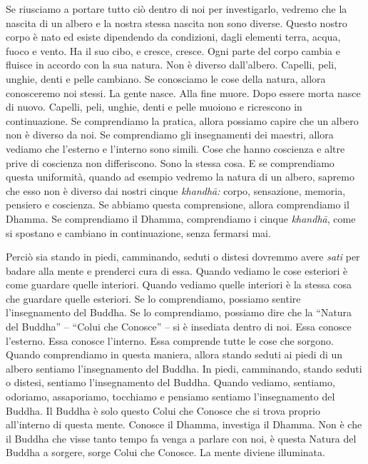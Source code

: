 Se riusciamo a portare tutto ciò dentro di noi per investigarlo, vedremo
che la nascita di un albero e la nostra stessa nascita non sono diverse.
Questo nostro corpo è nato ed esiste dipendendo da condizioni, dagli
elementi terra, acqua, fuoco e vento. Ha il suo cibo, e cresce, cresce.
Ogni parte del corpo cambia e fluisce in accordo con la sua natura. Non
è diverso dall'albero. Capelli, peli, unghie, denti e pelle cambiano. Se
conosciamo le cose della natura, allora conosceremo noi stessi. La gente
nasce. Alla fine muore. Dopo essere morta nasce di nuovo. Capelli, peli,
unghie, denti e pelle muoiono e ricrescono in continuazione. Se
comprendiamo la pratica, allora possiamo capire che un albero non è
diverso da noi. Se comprendiamo gli insegnamenti dei maestri, allora
vediamo che l'esterno e l'interno sono simili. Cose che hanno coscienza
e altre prive di coscienza non differiscono. Sono la stessa cosa. E se
comprendiamo questa uniformità, quando ad esempio vedremo la natura di
un albero, sapremo che esso non è diverso dai nostri cinque
\emph{khandhā:} corpo, sensazione, memoria, pensiero e coscienza. Se
abbiamo questa comprensione, allora comprendiamo il Dhamma. Se
comprendiamo il Dhamma, comprendiamo i cinque \emph{khandhā}, come si
spostano e cambiano in continuazione, senza fermarsi mai.

Perciò sia stando in piedi, camminando, seduti o distesi dovremmo avere
\emph{sati} per badare alla mente e prenderci cura di essa. Quando
vediamo le cose esteriori è come guardare quelle interiori. Quando
vediamo quelle interiori è la stessa cosa che guardare quelle esteriori.
Se lo comprendiamo, possiamo sentire l'insegnamento del Buddha. Se lo
comprendiamo, possiamo dire che la ``Natura del Buddha'' -- ``Colui che
Conosce'' -- si è insediata dentro di noi. Essa conosce l'esterno. Essa
conosce l'interno. Essa comprende tutte le cose che sorgono. Quando
comprendiamo in questa maniera, allora stando seduti ai piedi di un
albero sentiamo l'insegnamento del Buddha. In piedi, camminando, stando
seduti o distesi, sentiamo l'insegnamento del Buddha. Quando vediamo,
sentiamo, odoriamo, assaporiamo, tocchiamo e pensiamo sentiamo
l'insegnamento del Buddha. Il Buddha è solo questo Colui che Conosce che
si trova proprio all'interno di questa mente. Conosce il Dhamma,
investiga il Dhamma. Non è che il Buddha che visse tanto tempo fa venga
a parlare con noi, è questa Natura del Buddha a sorgere, sorge Colui che
Conosce. La mente diviene illuminata.

